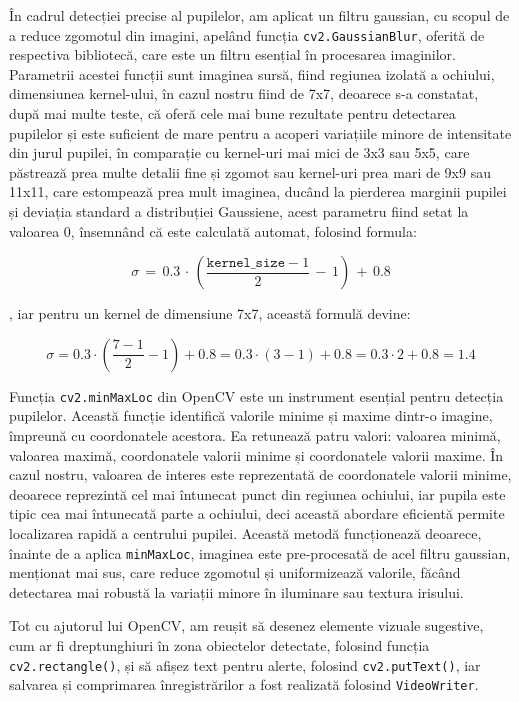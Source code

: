 \documentclass[12pt,a4paper]{article}
\begin{document}
În cadrul detecției precise al pupilelor, am aplicat un filtru gaussian,
cu scopul de a reduce zgomotul din imagini, apelând funcția
\texttt{cv2.GaussianBlur}, oferită de respectiva bibliotecă, care este un filtru
esențial în procesarea imaginilor. Parametrii acestei funcții sunt
imaginea sursă, fiind regiunea izolată a ochiului, dimensiunea
kernel-ului, în cazul nostru fiind de 7x7, deoarece s-a constatat, după
mai multe teste, că oferă cele mai bune rezultate pentru detectarea
pupilelor și este suficient de mare pentru a acoperi variațiile minore
de intensitate din jurul pupilei, în comparație cu kernel-uri mai mici
de 3x3 sau 5x5, care păstrează prea multe detalii fine și zgomot sau
kernel-uri prea mari de 9x9 sau 11x11, care estompează prea mult
imaginea, ducând la pierderea marginii pupilei și deviația standard a
distribuției Gaussiene, acest parametru fiind setat la valoarea 0,
însemnând că este calculată automat, folosind formula:

\begin{equation}
\sigma\, = \, 0.3\, \cdot \,\left( \frac{\texttt{kernel\_size} - 1}{2}\, - \, 1 \right)\, + \, 0.8
\end{equation}

, iar pentru un kernel de dimensiune 7x7, această formulă devine:

\begin{equation}
\sigma = 0.3 \cdot \left( \frac{7 - 1}{2} - 1 \right) + 0.8 = 0.3 \cdot (3 - 1) + 0.8 = 0.3 \cdot 2 + 0.8 = 1.4
\end{equation}

Funcția \texttt{cv2.minMaxLoc} din OpenCV este un instrument esențial pentru
detecția pupilelor. Această funcție identifică valorile minime și maxime
dintr-o imagine, împreună cu coordonatele acestora. Ea retunează patru
valori: valoarea minimă, valoarea maximă, coordonatele valorii minime și
coordonatele valorii maxime. În cazul nostru, valoarea de interes este
reprezentată de coordonatele valorii minime, deoarece reprezintă cel mai
întunecat punct din regiunea ochiului, iar pupila este tipic cea mai
întunecată parte a ochiului, deci această abordare eficientă permite
localizarea rapidă a centrului pupilei. Această metodă funcționează
deoarece, înainte de a aplica \texttt{minMaxLoc}, imaginea este pre-procesată de
acel filtru gaussian, menționat mai sus, care reduce zgomotul și
uniformizează valorile, făcând detectarea mai robustă la variații minore
în iluminare sau textura irisului.

Tot cu ajutorul lui OpenCV, am reușit să desenez elemente vizuale
sugestive, cum ar fi dreptunghiuri în zona obiectelor detectate,
folosind funcția \texttt{cv2.rectangle()}, și să afișez text pentru alerte,
folosind \texttt{cv2.putText()}, iar salvarea și comprimarea înregistrărilor a
fost realizată folosind \texttt{VideoWriter}.
\end{document}
